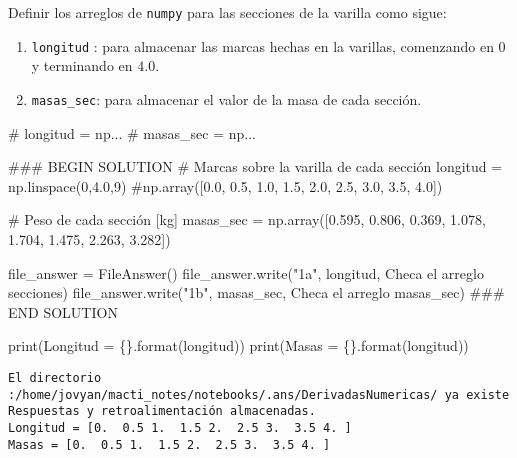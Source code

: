 \documentclass[
  letterpaper,
  DIV=11,
  numbers=noendperiod]{scrreprt}
\newenvironment{Shaded}{\begin{snugshade}}{\end{snugshade}}
\newcommand{\BuiltInTok}[1]{\textcolor[rgb]{0.00,0.23,0.31}{#1}}
\newcommand{\CommentTok}[1]{\textcolor[rgb]{0.37,0.37,0.37}{#1}}
\newcommand{\DecValTok}[1]{\textcolor[rgb]{0.68,0.00,0.00}{#1}}
\newcommand{\FloatTok}[1]{\textcolor[rgb]{0.68,0.00,0.00}{#1}}
\newcommand{\NormalTok}[1]{\textcolor[rgb]{0.00,0.23,0.31}{#1}}
\newcommand{\OperatorTok}[1]{\textcolor[rgb]{0.37,0.37,0.37}{#1}}
\newcommand{\RegionMarkerTok}[1]{\textcolor[rgb]{0.00,0.23,0.31}{#1}}
\newcommand{\SpecialCharTok}[1]{\textcolor[rgb]{0.37,0.37,0.37}{#1}}
\newcommand{\StringTok}[1]{\textcolor[rgb]{0.13,0.47,0.30}{#1}}
\begin{document}
Definir los arreglos de \texttt{numpy} para las secciones de la varilla
como sigue:

\begin{enumerate}
\def\labelenumi{\alph{enumi}.}
\item
  \texttt{longitud} : para almacenar las marcas hechas en la varillas,
  comenzando en \(0\) y terminando en \(4.0\).
\item
  \texttt{masas\_sec}: para almacenar el valor de la masa de cada
  sección.
\end{enumerate}

\begin{Shaded}
\begin{Highlighting}[]
\CommentTok{\# longitud = np...}
\CommentTok{\# masas\_sec = np...}

\CommentTok{\#\#\# }\RegionMarkerTok{BEGIN}\CommentTok{ SOLUTION}
\CommentTok{\# Marcas sobre la varilla de cada sección}
\NormalTok{longitud }\OperatorTok{=}\NormalTok{ np.linspace(}\DecValTok{0}\NormalTok{,}\FloatTok{4.0}\NormalTok{,}\DecValTok{9}\NormalTok{)}
\CommentTok{\#np.array([0.0, 0.5, 1.0, 1.5, 2.0, 2.5, 3.0, 3.5,  4.0]) }

\CommentTok{\# Peso de cada sección [kg]}
\NormalTok{masas\_sec }\OperatorTok{=}\NormalTok{ np.array([}\FloatTok{0.595}\NormalTok{, }\FloatTok{0.806}\NormalTok{, }\FloatTok{0.369}\NormalTok{, }\FloatTok{1.078}\NormalTok{, }\FloatTok{1.704}\NormalTok{, }\FloatTok{1.475}\NormalTok{, }\FloatTok{2.263}\NormalTok{,  }\FloatTok{3.282}\NormalTok{])}

\NormalTok{file\_answer }\OperatorTok{=}\NormalTok{ FileAnswer()}
\NormalTok{file\_answer.write(}\StringTok{"1a"}\NormalTok{, longitud, }\StringTok{\textquotesingle{}Checa el arreglo secciones\textquotesingle{}}\NormalTok{)}
\NormalTok{file\_answer.write(}\StringTok{"1b"}\NormalTok{, masas\_sec, }\StringTok{\textquotesingle{}Checa el arreglo masas\_sec\textquotesingle{}}\NormalTok{)}
\CommentTok{\#\#\# }\RegionMarkerTok{END}\CommentTok{ SOLUTION}

\BuiltInTok{print}\NormalTok{(}\StringTok{\textquotesingle{}Longitud = }\SpecialCharTok{\{\}}\StringTok{\textquotesingle{}}\NormalTok{.}\BuiltInTok{format}\NormalTok{(longitud))}
\BuiltInTok{print}\NormalTok{(}\StringTok{\textquotesingle{}Masas = }\SpecialCharTok{\{\}}\StringTok{\textquotesingle{}}\NormalTok{.}\BuiltInTok{format}\NormalTok{(longitud))}
\end{Highlighting}
\end{Shaded}

\begin{verbatim}
El directorio :/home/jovyan/macti_notes/notebooks/.ans/DerivadasNumericas/ ya existe
Respuestas y retroalimentación almacenadas.
Longitud = [0.  0.5 1.  1.5 2.  2.5 3.  3.5 4. ]
Masas = [0.  0.5 1.  1.5 2.  2.5 3.  3.5 4. ]
\end{verbatim}
\end{document}
